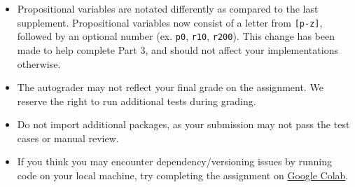 \documentclass{article}
\begin{document}
    \begin{itemize}
        \item Propositional variables are notated differently as compared to the last supplement. Propositional variables now consist of a letter from \lstinline{[p-z]}, followed by an optional number (ex. \lstinline{p0}, \lstinline{r10}, \lstinline{r200}). This change has been made to help complete Part 3, and should not affect your implementations otherwise.
        \item The autograder may not reflect your final grade on the assignment. We reserve the right to run additional tests during grading.
        \item Do not import additional packages, as your submission may not pass the test cases or manual review.
        \item If you think you may encounter dependency/versioning issues by running code on your local machine, try completing the assignment on \href{https://colab.research.google.com/}{Google Colab}.
    \end{itemize}
\end{document}
